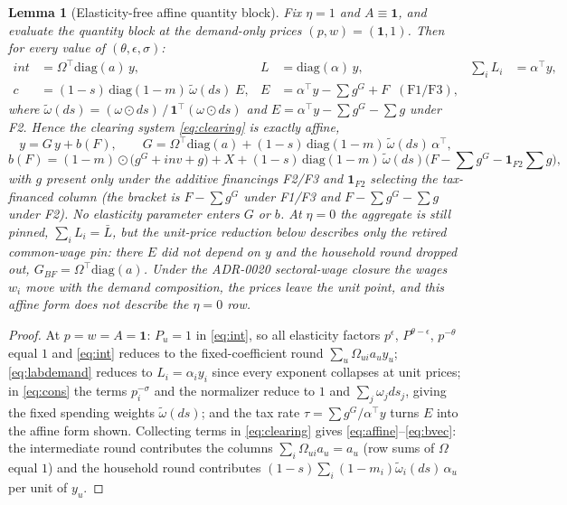\documentclass[11pt]{article}
\newtheorem{lemma}{Lemma}
\numberwithin{equation}{section}
\newcommand{\Lbar}{\bar{L}}
\newcommand{\one}{\mathbf{1}}
\begin{document}
\begin{lemma}[Elasticity-free affine quantity block]\label{lem:affine}
Fix $\eta = 1$ and $A \equiv \one$, and evaluate the quantity block at the
demand-only prices $(p,w) = (\one,1)$. Then for \emph{every} value of
$(\theta,\epsilon,\sigma)$:
\begin{align}
int &= \Omega^{\!\top}\mathrm{diag}(a)\, y, &
L &= \mathrm{diag}(\alpha)\, y, &
\sum_i L_i &= \alpha^{\!\top} y,
\label{eq:leontiefblocks}\\
c &= (1-s)\,\mathrm{diag}(1-m)\,\tilde\omega(ds)\; E, &
E &= \alpha^{\!\top} y - \textstyle\sum g^G + F
   \;\; (\text{F1/F3}), \nonumber
\end{align}
where $\tilde\omega(ds) = (\omega \odot ds)\,/\, \one^{\!\top}(\omega \odot
ds)$ and $E = \alpha^{\!\top} y - \sum g^G - \sum g$ under F2. Hence the
clearing system \eqref{eq:clearing} is exactly affine,
\begin{equation}
y = G\, y + b(F),
\qquad
G = \Omega^{\!\top}\mathrm{diag}(a)
  + (1-s)\,\mathrm{diag}(1-m)\,\tilde\omega(ds)\,\alpha^{\!\top},
\label{eq:affine}
\end{equation}
\begin{equation}
b(F) = (1-m)\odot\big( g^G + inv + g \big) + X
     + (1-s)\,\mathrm{diag}(1-m)\,\tilde\omega(ds)
       \big( F - \textstyle\sum g^G - \mathbf{1}_{F2}\textstyle\sum g \big),
\label{eq:bvec}
\end{equation}
\textcolor{revisionV3}{with $g$ present only under the additive financings
F2/F3 and $\mathbf{1}_{F2}$ selecting the tax-financed column (the bracket is
$F-\sum g^G$ under F1/F3 and $F-\sum g^G-\sum g$ under F2).}
No elasticity parameter enters $G$ or $b$. \textcolor{revisionV1}{At
$\eta = 0$ the aggregate is still pinned, $\sum_i L_i = \Lbar$, but the
unit-price reduction below describes only the \emph{retired} common-wage
pin: there $E$ did not depend on $y$ and the household round dropped out,
$G_{BF} = \Omega^{\!\top}\mathrm{diag}(a)$. Under the ADR-0020 sectoral-wage
closure the wages $w_i$ move with the demand composition, the prices leave
the unit point, and this affine form does not describe the $\eta = 0$ row.}
\end{lemma}

\begin{proof}
At $p = w = A = \one$: $P_u = 1$ in \eqref{eq:int}, so all elasticity
factors $p^{\epsilon}$, $P^{\theta-\epsilon}$, $p^{-\theta}$ equal $1$ and
\eqref{eq:int} reduces to the fixed-coefficient round
$\sum_u \Omega_{ui} a_u y_u$; \eqref{eq:labdemand} reduces to
$L_i = \alpha_i y_i$ since every exponent collapses at unit prices; in
\eqref{eq:cons} the terms $p_i^{-\sigma}$ and the normalizer reduce to
$1$ and $\sum_j \omega_j ds_j$, giving the fixed spending weights
$\tilde\omega(ds)$; and the tax rate $\tau = \sum g^G / \alpha^{\!\top}y$
turns $E$ into the affine form shown. Collecting terms in
\eqref{eq:clearing} gives \eqref{eq:affine}--\eqref{eq:bvec}: the
intermediate round contributes the columns
\textcolor{revisionV3}{$\sum_i \Omega_{ui} a_u = a_u$} (row sums of $\Omega$ equal $1$) and the
household round contributes $(1-s)\sum_i (1-m_i)\tilde\omega_i(ds)\,
\alpha_u$ per unit of $y_u$.
\end{proof}
\end{document}

